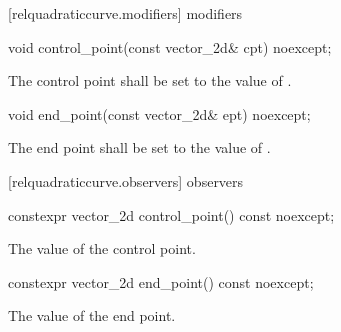  [relquadraticcurve.modifiers]{ modifiers}

\begin{itemdecl}
    void control_point(const vector_2d& cpt) noexcept;
\end{itemdecl}
\begin{itemdescr}
	\pnum
	\effects
	The control point shall be set to the value of .
\end{itemdescr}

\begin{itemdecl}
    void end_point(const vector_2d& ept) noexcept;
\end{itemdecl}
\begin{itemdescr}
	\pnum
	\effects
	The end point shall be set to the value of .
\end{itemdescr}

 [relquadraticcurve.observers]{ observers}

\begin{itemdecl}
constexpr vector_2d control_point() const noexcept;
\end{itemdecl}
\begin{itemdescr}
	\pnum
	\returns
	The value of the control point.
\end{itemdescr}

\begin{itemdecl}
constexpr vector_2d end_point() const noexcept;
\end{itemdecl}
\begin{itemdescr}
	\pnum
	\returns
	The value of the end point.
\end{itemdescr}

